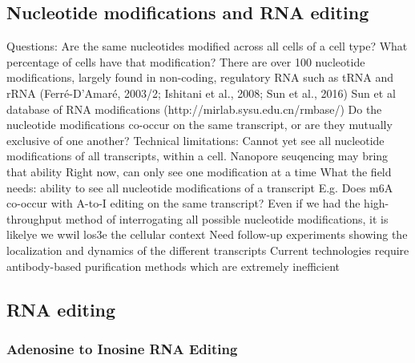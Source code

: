 \subsection{Nucleotide modifications and RNA editing}
Questions:
Are the same nucleotides modified across all cells of a cell type? 
What percentage of cells have that modification?
There are over 100 nucleotide modifications, largely found in non-coding, regulatory RNA such as tRNA and rRNA (Ferré-D’Amaré, 2003/2; Ishitani et al., 2008; Sun et al., 2016)
Sun et al database of RNA modifications (http://mirlab.sysu.edu.cn/rmbase/) 
Do the nucleotide modifications co-occur on the same transcript, or are they mutually exclusive of one another?
Technical limitations:
Cannot yet see all nucleotide modifications of all transcripts, within a cell.
Nanopore seuqencing may bring that ability
Right now, can only see one modification at a time
What the field needs: ability to see all nucleotide modifications of a transcript
E.g. Does m6A co-occur with A-to-I editing on the same transcript?
Even if we had the high-throughput method of interrogating all possible nucleotide modifications, it is likelye we wwil los3e the cellular context
Need follow-up experiments showing the localization and dynamics of the different transcripts
Current technologies require antibody-based purification methods which are extremely inefficient


\subsection{RNA editing}

\subsubsection{Adenosine to Inosine RNA Editing}

